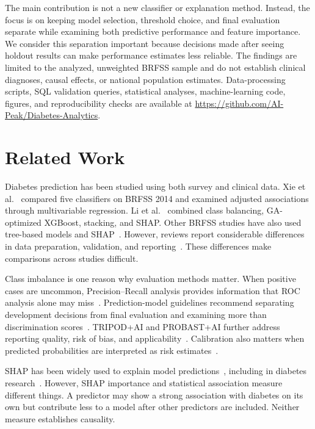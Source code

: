 \documentclass[pdflatex,sn-basic,Numbered]{sn-jnl}
\begin{document}
The main contribution is not a new classifier or explanation method. Instead, the focus is on keeping model selection, threshold choice, and final evaluation separate while examining both predictive performance and feature importance. We consider this separation important because decisions made after seeing holdout results can make performance estimates less reliable. The findings are limited to the analyzed, unweighted BRFSS sample and do not establish clinical diagnoses, causal effects, or national population estimates. Data-processing scripts, SQL validation queries, statistical analyses, machine-learning code, figures, and reproducibility checks are available at \url{https://github.com/AI-Peak/Diabetes-Analytics}.



\section{Related Work}
\label{sec:related}

Diabetes prediction has been studied using both survey and clinical data. Xie et al.~\citep{xie2019diabetes} compared five classifiers on BRFSS 2014 and examined adjusted associations through multivariable regression. Li et al.~\citep{li2024gaxgboost} combined class balancing, GA-optimized XGBoost, stacking, and SHAP. Other BRFSS studies have also used tree-based models and SHAP~\citep{majcherek2025aidriven,muhammad2025brfss}. However, reviews report considerable differences in data preparation, validation, and reporting~\citep{mohsen2023scoping}. These differences make comparisons across studies difficult.

Class imbalance is one reason why evaluation methods matter. When positive cases are uncommon, Precision--Recall analysis provides information that ROC analysis alone may miss~\citep{saito2015precisionrecall}. Prediction-model guidelines recommend separating development decisions from final evaluation and examining more than discrimination scores~\citep{efthimiou2024developing,collins2024evaluation}. TRIPOD+AI and PROBAST+AI further address reporting quality, risk of bias, and applicability~\citep{collins2024tripodai,moons2025probastai}. Calibration also matters when predicted probabilities are interpreted as risk estimates~\citep{huang2020calibration}.

SHAP has been widely used to explain model predictions~\citep{lundberg2017unified,lundberg2020trees}, including in diabetes research~\citep{lugner2024predictors,prendin2023shap}. However, SHAP importance and statistical association measure different things. A predictor may show a strong association with diabetes on its own but contribute less to a model after other predictors are included. Neither measure establishes causality.
\end{document}
